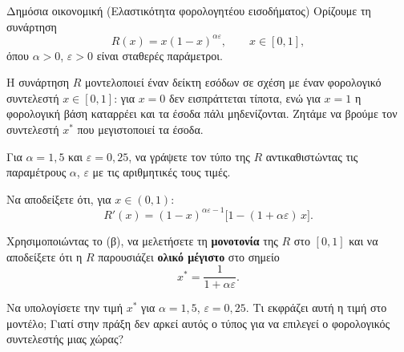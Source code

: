 \begin{problhma}{Δημόσια οικονομική (Ελαστικότητα φορολογητέου εισοδήματος)}
Ορίζουμε τη συνάρτηση
\[
  R(x) = x(1-x)^{\alpha\varepsilon}, \qquad x \in [0,1],
\]
όπου $\alpha > 0$, $\varepsilon > 0$ είναι σταθερές παράμετροι.
 
\medskip
\noindent
Η συνάρτηση $R$ μοντελοποιεί έναν δείκτη εσόδων σε σχέση με έναν φορολογικό
συντελεστή $x \in [0,1]$: για $x=0$ δεν εισπράττεται τίποτα, ενώ για $x=1$
η φορολογική βάση καταρρέει και τα έσοδα πάλι μηδενίζονται. Ζητάμε να
βρούμε τον συντελεστή $x^*$ που μεγιστοποιεί τα έσοδα.
 
\begin{alist}
  \item Για $\alpha = 1{,}5$ και $\varepsilon = 0{,}25$, να γράψετε τον τύπο της
        $R$ αντικαθιστώντας τις παραμέτρους $\alpha$, $\varepsilon$ με τις
        αριθμητικές τους τιμές.
  \item Να αποδείξετε ότι, για $x \in (0,1)$:
        \[
          R'(x) = (1-x)^{\alpha\varepsilon-1}\bigl[1-(1+\alpha\varepsilon)\,x\bigr].
        \]
  \item Χρησιμοποιώντας το (β), να μελετήσετε τη \textbf{μονοτονία} της $R$
        στο $[0,1]$ και να αποδείξετε ότι η $R$ παρουσιάζει \textbf{ολικό
        μέγιστο} στο σημείο
        \[
          x^* = \frac{1}{1+\alpha\varepsilon}.
        \]
  \item Να υπολογίσετε την τιμή $x^*$ για $\alpha = 1{,}5$,
        $\varepsilon = 0{,}25$. Τι εκφράζει αυτή η τιμή στο μοντέλο; Γιατί
        στην πράξη δεν αρκεί αυτός ο τύπος για να επιλεγεί ο φορολογικός
        συντελεστής μιας χώρας?
\end{alist}
\end{problhma}

